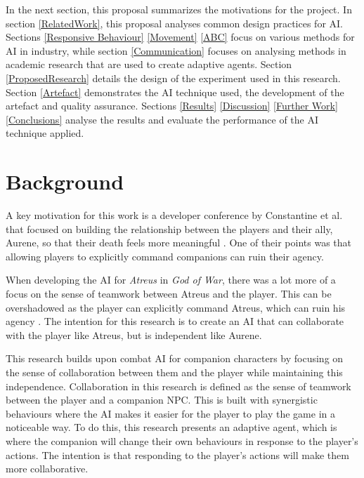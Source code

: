\documentclass{IEEEtran}
\begin{document}
In the next section, this proposal summarizes the motivations for the project. In section \ref{RelatedWork}, this proposal analyses common design practices for AI. Sections \ref{Responsive Behaviour} \ref{Movement} \ref{ABC} focus on various methods for AI in industry, while section \ref{Communication} focuses on analysing methods in academic research that are used to create adaptive agents. Section \ref{ProposedResearch} details the design of the experiment used in this research. Section \ref{Artefact} demonstrates the AI technique used, the development of the artefact and quality assurance. Sections \ref{Results} \ref{Discussion} \ref{Further Work} \ref{Conclusions} analyse the results and evaluate the performance of the AI technique applied.


\section{Background}
\label{Background}

A key motivation for this work is a developer conference by Constantine et al. that focused on building the relationship between the players and their ally, Aurene, so that their death feels more meaningful \cite{EGXCharacterDeathGuildWars}. One of their points was that allowing players to explicitly command companions can ruin their agency.

When developing the AI for \textit{Atreus} in \textit{God of War}, there was a lot more of a focus on the sense of teamwork between Atreus and the player. This can be overshadowed as the player can explicitly command Atreus, which can ruin his agency \cite{EGXCharacterDeathGuildWars}. The intention for this research is to create an AI that can collaborate with the player like Atreus, but is independent like Aurene.

This research builds upon combat AI for companion characters by focusing on the sense of collaboration between them and the player while maintaining this independence. Collaboration in this research is defined as the sense of teamwork between the player and a companion NPC. This is built with synergistic behaviours where the AI makes it easier for the player to play the game in a noticeable way. To do this, this research presents an adaptive agent, which is where the companion will change their own behaviours in response to the player's actions. The intention is that responding to the player's actions will make them more collaborative.
\end{document}
